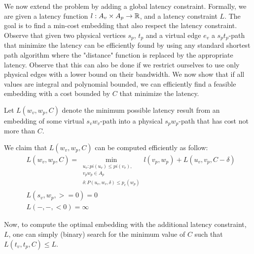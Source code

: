 We now extend the problem by adding a global latency constraint.
Formally, we are given a latency function $l : A_v \times A_p \to \mathbb{R}$,
and a latency constraint $L$.
The goal is to find a min-cost embedding that also respect the latency
constraint.
Observe that given two physical vertices $s_p$, $t_p$ and a virtual edge $e_v$
a $s_pt_p$-path that minimize the latency can be efficiently found by using any
standard shortest path algorithm where the "distance" function is replaced by
the appropriate latency.
Observe that this can also be done if we restrict ourselves to use only physical
edges with a lower bound on their bandwidth.
We now show that if all values are integral and polynomial bounded, we can
efficiently find a feasible embedding with a cost bounded by $C$ that minimize
the latency.

Let $L(w_v, w_p, C)$ denote the minimum possible latency result from an
embedding of some virtual $s_vw_v$-path into a physical $s_pw_p$-path 
that has cost not more than $C$.

We claim that $L(w_v, w_p, C)$ can be computed efficiently as follow:
\begin{align*}
&L(w_v, w_p, C) = \min_{\substack{
u_v : pi(u_v) \leq pi(v_v), 
\\
v_pw_p \in A_p
\\
\delta : P(u_v, w_v, \delta) \leq p_c(w_p)
}}
l(v_p, w_p) + L(u_v, v_p, C - \delta)
\\
&L(s_v, w_p, >=0) = 0
\\
&L(-, -, <0) = \infty
\end{align*} 

Now, to compute the optimal embedding with the additional latency constraint,
$L$, one can simply (binary) search for the minimum value of $C$ such that
$L(t_v, t_p, C) \leq L$.  
